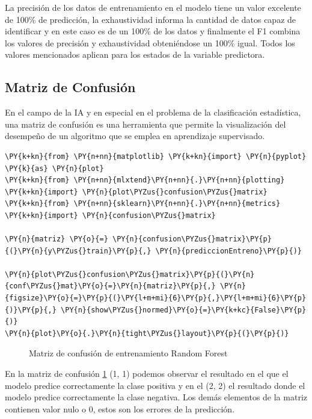     La precisión de los datos de entrenamiento en el modelo tiene un valor
excelente de 100\% de predicción, la exhaustividad informa la cantidad
de datos capaz de identificar y en este caso es de un 100\% de los datos
y finalmente el F1 combina los valores de precisión y exhaustividad
obteniéndose un 100\% igual. Todos los valores mencionados aplican para
los estados de la variable predictora.

    \hypertarget{matriz-de-confusiuxf3n}{%
\subsection{Matriz de Confusión}\label{matriz-de-confusiuxf3n}}

En el campo de la IA y en especial en el problema
de la clasificación estadística, una matriz de confusión es una
herramienta que permite la visualización del desempeño de un algoritmo
que se emplea en aprendizaje supervisado.

    \begin{tcolorbox}[breakable, size=fbox, boxrule=1pt, pad at break*=1mm,colback=cellbackground, colframe=cellborder]
\begin{Verbatim}[commandchars=\\\{\}]
\PY{k+kn}{from} \PY{n+nn}{matplotlib} \PY{k+kn}{import} \PY{n}{pyplot} \PY{k}{as} \PY{n}{plot}
\PY{k+kn}{from} \PY{n+nn}{mlxtend}\PY{n+nn}{.}\PY{n+nn}{plotting} \PY{k+kn}{import} \PY{n}{plot\PYZus{}confusion\PYZus{}matrix}
\PY{k+kn}{from} \PY{n+nn}{sklearn}\PY{n+nn}{.}\PY{n+nn}{metrics} \PY{k+kn}{import} \PY{n}{confusion\PYZus{}matrix}

\PY{n}{matriz} \PY{o}{=} \PY{n}{confusion\PYZus{}matrix}\PY{p}{(}\PY{n}{y\PYZus{}train}\PY{p}{,} \PY{n}{prediccionEntreno}\PY{p}{)}

\PY{n}{plot\PYZus{}confusion\PYZus{}matrix}\PY{p}{(}\PY{n}{conf\PYZus{}mat}\PY{o}{=}\PY{n}{matriz}\PY{p}{,} \PY{n}{figsize}\PY{o}{=}\PY{p}{(}\PY{l+m+mi}{6}\PY{p}{,}\PY{l+m+mi}{6}\PY{p}{)}\PY{p}{,} \PY{n}{show\PYZus{}normed}\PY{o}{=}\PY{k+kc}{False}\PY{p}{)}
\PY{n}{plot}\PY{o}{.}\PY{n}{tight\PYZus{}layout}\PY{p}{(}\PY{p}{)}
\end{Verbatim}
\end{tcolorbox}

\begin{center}
    	\begin{figure}[H]
	\centering
	\caption{Matriz de confusión de entrenamiento Random Forest}
	\label{fig:mcerf}
	\end{figure}
\end{center}
    
    En la matriz de confusión \ref{fig:mcerf} (1, 1) podemos observar el resultado en el que
el modelo predice correctamente la clase positiva y en el (2, 2) el
resultado donde el modelo predice correctamente la clase negativa. Los
demás elementos de la matriz contienen valor nulo o 0, estos son los
errores de la predicción.
